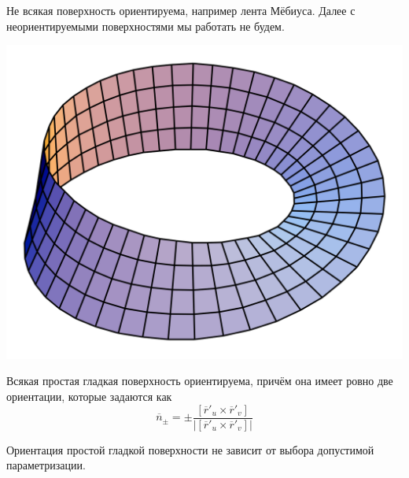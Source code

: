 \noindent 
\begin{minipage}{0.7\textwidth}
\begin{note}
    Не всякая поверхность ориентируема, например лента Мёбиуса. Далее с неориентируемыми поверхностями мы работать не будем.
\end{note}
\end{minipage}
\begin{minipage}{0.3\textwidth}
\includegraphics[width=\textwidth]{images/mebius.png}
\end{minipage}


\begin{note}
    Всякая простая гладкая поверхность ориентируема, причём она имеет ровно две ориентации, которые задаются как \[\overline{n}_\pm = \pm \dfrac{[\overline{r}'_u \times \overline{r}'_v]}{|[\overline{r}'_u \times \overline{r}'_v]|}\]
\end{note}
\begin{corollary}
    Ориентация простой гладкой поверхности не зависит от выбора допустимой параметризации.
\end{corollary}


